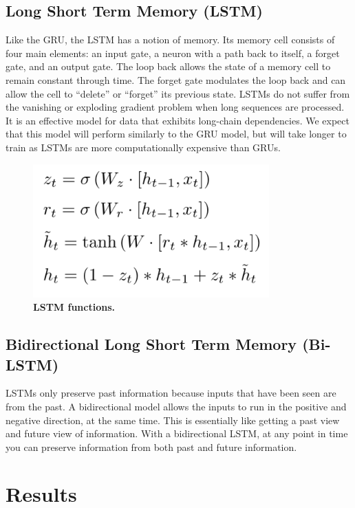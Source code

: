 \documentclass[11pt,a4paper]{article}
\begin{document}
	
	\subsection{Long Short Term Memory (LSTM)}
	
	Like the GRU, the LSTM has a notion of memory. Its memory cell consists of four main elements: an input gate, a neuron with a path back to itself, a forget gate, and an output gate. The loop back allows the state of a memory cell to remain constant through time. The forget gate modulates the loop back and can allow the cell to “delete” or “forget” its previous state. LSTMs do not suffer from the vanishing or exploding gradient problem when long sequences are processed. It is an effective model for data that exhibits long-chain dependencies. We expect that this model will perform similarly to the GRU model, but will take longer to train as LSTMs are more computationally expensive than GRUs.  
	
	 
	
	\begin{figure}[H]
		\centering\includegraphics[scale=0.5]{lstm_functions} 
		\caption{\textbf{ LSTM functions.}}
	\end{figure}
	\subsection{Bidirectional Long Short Term Memory (Bi-LSTM)}
	LSTMs only preserve past information because inputs that have been seen are from the past. A bidirectional model allows the inputs to run in the positive and negative direction, at the same time. This is essentially like getting a past view and future view of information. With a bidirectional LSTM, at any point in time you can preserve information from both past and future information.
	
	
\section{Results}
\end{document}
